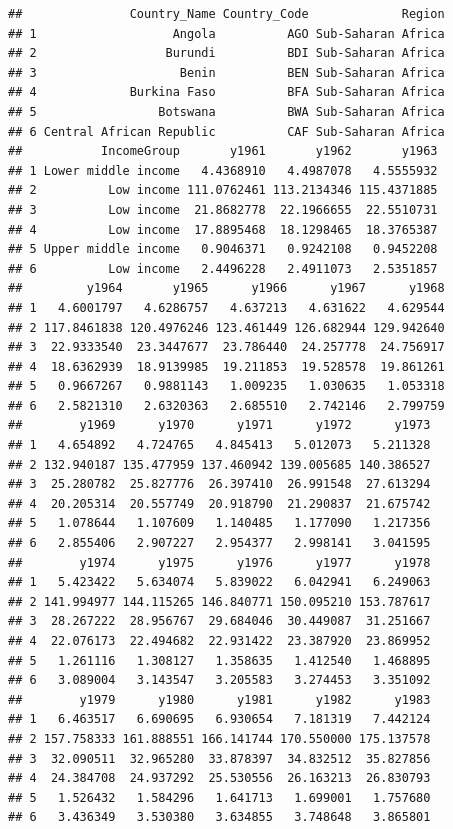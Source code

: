 \documentclass[
]{book}
\begin{document}
\begin{verbatim}
##               Country_Name Country_Code             Region
## 1                   Angola          AGO Sub-Saharan Africa
## 2                  Burundi          BDI Sub-Saharan Africa
## 3                    Benin          BEN Sub-Saharan Africa
## 4             Burkina Faso          BFA Sub-Saharan Africa
## 5                 Botswana          BWA Sub-Saharan Africa
## 6 Central African Republic          CAF Sub-Saharan Africa
##           IncomeGroup       y1961       y1962       y1963
## 1 Lower middle income   4.4368910   4.4987078   4.5555932
## 2          Low income 111.0762461 113.2134346 115.4371885
## 3          Low income  21.8682778  22.1966655  22.5510731
## 4          Low income  17.8895468  18.1298465  18.3765387
## 5 Upper middle income   0.9046371   0.9242108   0.9452208
## 6          Low income   2.4496228   2.4911073   2.5351857
##         y1964       y1965      y1966      y1967      y1968
## 1   4.6001797   4.6286757   4.637213   4.631622   4.629544
## 2 117.8461838 120.4976246 123.461449 126.682944 129.942640
## 3  22.9333540  23.3447677  23.786440  24.257778  24.756917
## 4  18.6362939  18.9139985  19.211853  19.528578  19.861261
## 5   0.9667267   0.9881143   1.009235   1.030635   1.053318
## 6   2.5821310   2.6320363   2.685510   2.742146   2.799759
##        y1969      y1970      y1971      y1972      y1973
## 1   4.654892   4.724765   4.845413   5.012073   5.211328
## 2 132.940187 135.477959 137.460942 139.005685 140.386527
## 3  25.280782  25.827776  26.397410  26.991548  27.613294
## 4  20.205314  20.557749  20.918790  21.290837  21.675742
## 5   1.078644   1.107609   1.140485   1.177090   1.217356
## 6   2.855406   2.907227   2.954377   2.998141   3.041595
##        y1974      y1975      y1976      y1977      y1978
## 1   5.423422   5.634074   5.839022   6.042941   6.249063
## 2 141.994977 144.115265 146.840771 150.095210 153.787617
## 3  28.267222  28.956767  29.684046  30.449087  31.251667
## 4  22.076173  22.494682  22.931422  23.387920  23.869952
## 5   1.261116   1.308127   1.358635   1.412540   1.468895
## 6   3.089004   3.143547   3.205583   3.274453   3.351092
##        y1979      y1980      y1981      y1982      y1983
## 1   6.463517   6.690695   6.930654   7.181319   7.442124
## 2 157.758333 161.888551 166.141744 170.550000 175.137578
## 3  32.090511  32.965280  33.878397  34.832512  35.827856
## 4  24.384708  24.937292  25.530556  26.163213  26.830793
## 5   1.526432   1.584296   1.641713   1.699001   1.757680
## 6   3.436349   3.530380   3.634855   3.748648   3.865801

\end{verbatim}
\end{document}
